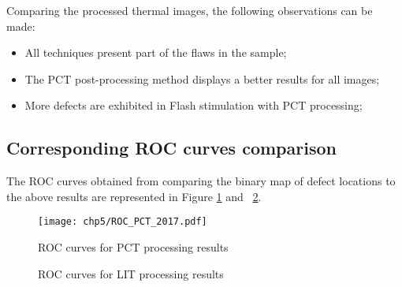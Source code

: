 Comparing the processed thermal images, the following observations can be made:  
\begin{itemize}
    \item All techniques present part of the flaws in the sample;
    \item The PCT post-processing method displays a better results for all images;
    \item More defects are exhibited in Flash stimulation with PCT processing;
\end{itemize}


\subsection{Corresponding ROC curves comparison}
The ROC curves obtained from comparing the binary map of defect locations to the above results are represented in Figure \ref{roc_pct} and ~\ref{ROC_curve}.
\begin{figure}[htbp]
   \centering
   \texttt{[image: chp5/ROC\_PCT\_2017.pdf]}
   \caption{ROC curves for PCT processing results}
   \label{roc_pct}
\end{figure}


\begin{figure}[ht]
    \centering
    \hspace{10pt}
    \caption{ROC curves for LIT processing results}
    \label{ROC_curve}
\end{figure}

